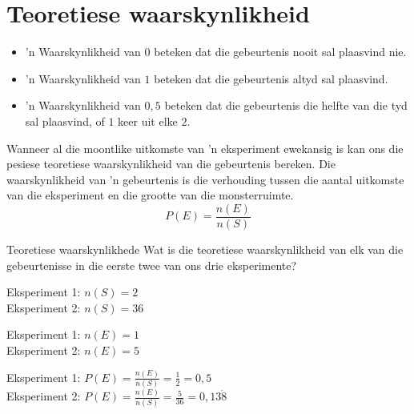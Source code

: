 
\section{Teoretiese waarskynlikheid}
\begin{itemize}
\item 'n Waarskynlikheid van $0$ beteken dat die gebeurtenis nooit sal plaasvind nie.
\item 'n Waarskynlikheid van $1$ beteken dat die gebeurtenis altyd sal plaasvind.
\item 'n Waarskynlikheid van $0,5$ beteken dat die gebeurtenis die helfte van die tyd sal plaasvind, of $1$ keer uit elke $2$.
\end{itemize}



Wanneer al die moontlike uitkomste van 'n eksperiment ewekansig is kan ons die pesiese teoretiese waarskynlikheid van die gebeurtenis bereken. Die waarskynlikheid van 'n gebeurtenis is die verhouding tussen die aantal uitkomste van die eksperiment en die grootte van die monsterruimte.
\[P(E) = \frac{n(E)}{n(S)}\] \par

\begin{wex}{Teoretiese waarskynlikhede}{
Wat is die teoretiese waarskynlikheid van elk van die gebeurtenisse in die eerste twee van ons drie eksperimente?
}{

  
  Eksperiment 1: $n(S) = 2$\\
 Eksperiment 2: $n(S) = 36$\\
  
  


  Eksperiment 1: $n(E) = 1$\\
 Eksperiment 2: $n(E) = 5$\\




  Eksperiment 1: $P(E) = \frac{n(E)}{n(S)} = \frac{1}{2} = 0,5$\\
  Eksperiment 2: $P(E) = \frac{n(E)}{n(S)} = \frac{5}{36} = 0,13\dot{8}$\\
}
\end{wex}

